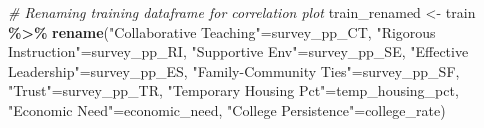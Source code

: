 \documentclass[
  man]{apa6}
\newenvironment{Shaded}{\begin{snugshade}}{\end{snugshade}}
\newcommand{\CommentTok}[1]{\textcolor[rgb]{0.56,0.35,0.01}{\textit{#1}}}
\newcommand{\FunctionTok}[1]{\textcolor[rgb]{0.13,0.29,0.53}{\textbf{#1}}}
\newcommand{\NormalTok}[1]{#1}
\newcommand{\OtherTok}[1]{\textcolor[rgb]{0.56,0.35,0.01}{#1}}
\newcommand{\SpecialCharTok}[1]{\textcolor[rgb]{0.81,0.36,0.00}{\textbf{#1}}}
\newcommand{\StringTok}[1]{\textcolor[rgb]{0.31,0.60,0.02}{#1}}
\begin{document}
\begin{Shaded}
\begin{Highlighting}[]
\CommentTok{\# Renaming training dataframe for correlation plot}
\NormalTok{train\_renamed }\OtherTok{\textless{}{-}}\NormalTok{ train }\SpecialCharTok{\%\textgreater{}\%}
  \FunctionTok{rename}\NormalTok{(}\StringTok{"Collaborative Teaching"}\OtherTok{=}\NormalTok{survey\_pp\_CT,}
         \StringTok{"Rigorous Instruction"}\OtherTok{=}\NormalTok{survey\_pp\_RI,}
         \StringTok{"Supportive Env"}\OtherTok{=}\NormalTok{survey\_pp\_SE,}
         \StringTok{"Effective Leadership"}\OtherTok{=}\NormalTok{survey\_pp\_ES,}
         \StringTok{"Family{-}Community Ties"}\OtherTok{=}\NormalTok{survey\_pp\_SF,}
         \StringTok{"Trust"}\OtherTok{=}\NormalTok{survey\_pp\_TR,}
         \StringTok{"Temporary Housing Pct"}\OtherTok{=}\NormalTok{temp\_housing\_pct,}
         \StringTok{"Economic Need"}\OtherTok{=}\NormalTok{economic\_need,}
         \StringTok{"College Persistence"}\OtherTok{=}\NormalTok{college\_rate)}


\end{Highlighting}
\end{Shaded}
\end{document}
